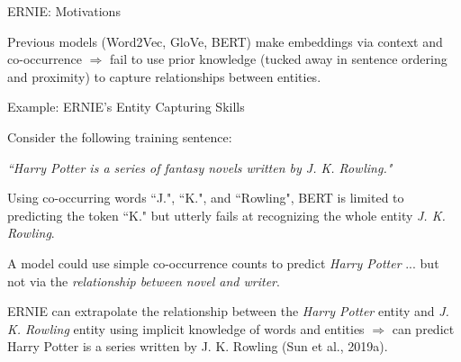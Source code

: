 \begin{frame}{ERNIE: Motivations}

    \vspace{10pt}
    
    \begin{itemizeSpaced}{2pt}
        \pinkbox Previous models (Word2Vec, GloVe, BERT) make embeddings via context and co-occurrence $\Rightarrow$ fail to use prior knowledge (tucked away in sentence ordering and proximity) to capture relationships between entities. 
    \end{itemizeSpaced}

    
    \vspace{-5pt}
    \begin{exampleBlock}{Example: ERNIE's Entity Capturing Skills}
        
        Consider the following training sentence: \newline 
        
        {\footnotesize \textit{``Harry Potter is a series of fantasy novels written by J. K. Rowling."}}\newline 
        
        Using co-occurring words ``J.", ``K.", and ``Rowling", BERT is limited to predicting the token ``K." but utterly fails at recognizing the whole entity \emph{J. K. Rowling}. \newline 
        
        A model could use simple co-occurrence counts to predict \emph{Harry Potter} ... but not via the \emph{\alert{relationship between novel and  writer}}. 
    \end{exampleBlock}


    \vspace{-5pt}
    \begin{itemizeSpaced}{2pt} 
        
         ERNIE can extrapolate the relationship between the \emph{Harry Potter} entity and \emph{J. K. Rowling} entity using implicit knowledge of words and entities $\Rightarrow$ can predict Harry Potter is a series written by J. K. Rowling (Sun et al., 2019a). 
    
    \end{itemizeSpaced}
    
\end{frame}


